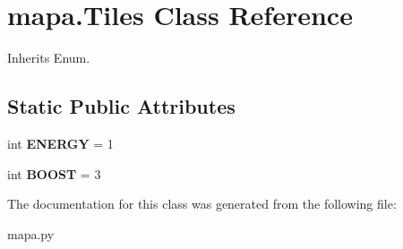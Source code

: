 \hypertarget{classmapa_1_1_tiles}{}\section{mapa.\+Tiles Class Reference}
\label{classmapa_1_1_tiles}


Inherits Enum.

\subsection*{Static Public Attributes}
\begin{DoxyCompactItemize}
\item 
\mbox{\label{classmapa_1_1_tiles_a0c9cbe4d16bdf353d7002a3361f5e8ba}} 
int {\bfseries E\+N\+E\+R\+GY} = 1
\item 
\mbox{\label{classmapa_1_1_tiles_ad5d760a681ef381610854a5d5161404b}} 
int {\bfseries B\+O\+O\+ST} = 3
\end{DoxyCompactItemize}


The documentation for this class was generated from the following file\+:\begin{DoxyCompactItemize}
\item 
mapa.\+py\end{DoxyCompactItemize}
